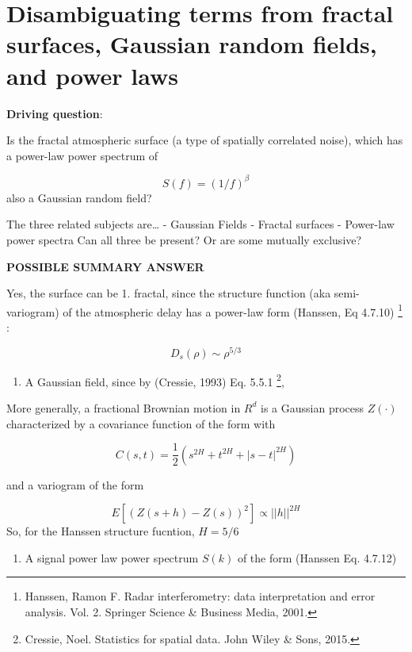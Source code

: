 \hypertarget{disambiguating-terms-from-fractal-surfaces-gaussian-random-fields-and-power-laws}{%
\section{Disambiguating terms from fractal surfaces, Gaussian random
fields, and power
laws}
\label{disambiguating-terms-from-fractal-surfaces-gaussian-random-fields-and-power-laws}}

\textbf{Driving question}:

Is the fractal atmospheric surface (a type of spatially correlated
noise), which has a power-law power spectrum of

\[S(f) = (1/f)^{\beta}\] also a Gaussian random field?

The three related subjects are\ldots{} - Gaussian Fields - Fractal
surfaces - Power-law power spectra Can all three be present? Or are some
mutually exclusive?

\textbf{POSSIBLE SUMMARY ANSWER}

Yes, the surface can be 1. fractal, since the structure function (aka
semi-variogram) of the atmospheric delay has a power-law form (Hanssen,
Eq 4.7.10) \footnote{Hanssen, Ramon F. Radar interferometry: data
  interpretation and error analysis. Vol. 2. Springer Science \&
  Business Media, 2001.} :

\[D_s(\rho) \sim \rho^{5/3}\]

\begin{enumerate}
\def\labelenumi{\arabic{enumi}.}
\setcounter{enumi}{1}
\tightlist
\item
  A Gaussian field, since by (Cressie, 1993) Eq. 5.5.1 \footnote{Cressie,
    Noel. Statistics for spatial data. John Wiley \& Sons, 2015.},
\end{enumerate}

More generally, a fractional Brownian motion in \(R^d\) is a Gaussian
process \(Z(\cdot)\) characterized by a covariance function of the form
with

\[C(s, t) = \frac{1}{2}\left(s^{2H} + t^{2H} + |s-t|^{2H}\right)\]

and a variogram of the form

\[E[(Z(s + h) - Z(s))^2] \propto ||h||^{2H}\] So, for the Hanssen
structure fucntion, \(H=5/6\)

\begin{enumerate}
\def\labelenumi{\arabic{enumi}.}
\setcounter{enumi}{2}
\tightlist
\item
  A signal power law power spectrum \(S(k)\) of the form (Hanssen Eq.
  4.7.12)
\end{enumerate}

